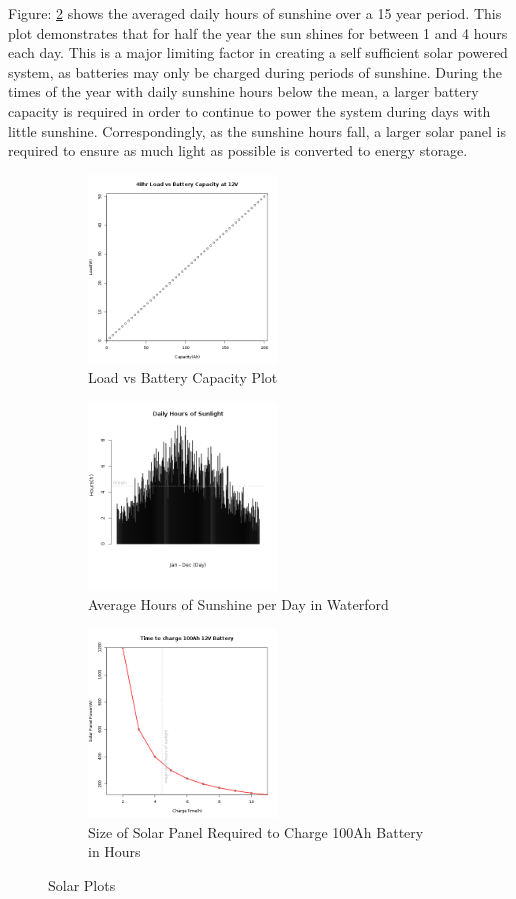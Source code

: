 \documentclass[runningheads,a4paper]{llncs}
\begin{document}
Figure: \ref{fig:barplot_hours_sunshine_waterford} shows the averaged daily hours of sunshine over a 15 year period. This plot demonstrates that for half the year the sun shines for between 1 and 4 hours each day. This is a major limiting factor in creating a self sufficient solar powered system, as batteries may only be charged during periods of sunshine. During the times of the year with daily sunshine hours below the mean, a larger battery capacity is required in order to continue to power the system during days with little sunshine. Correspondingly, as the sunshine hours fall, a larger solar panel is required to ensure as much light as possible is converted to energy storage.

%
\begin{figure}	
	\centering
	\begin{subfigure}[t]{5cm}
		\centering
		\includegraphics[width=5cm]{images/64}
		\caption{Load vs Battery Capacity Plot}\label{fig:lineplot_load_battery_capacity}		
	\end{subfigure}
	\quad
	\begin{subfigure}[t]{5cm}
		\centering
		\includegraphics[width=5cm]{images/66}
		\caption{Average Hours of Sunshine per Day in Waterford}\label{fig:barplot_hours_sunshine_waterford}
	\end{subfigure}
	\quad
	\begin{subfigure}[t]{5cm}
		\centering
		\includegraphics[width=5cm]{images/65}
		\caption{Size of Solar Panel Required to Charge 100Ah Battery in Hours}\label{fig:lineplot_solar_panel_battery_capacity_hours}
	\end{subfigure}
	\caption{Solar Plots}\label{fig:solar_plots}
\end{figure}
%
\end{document}

